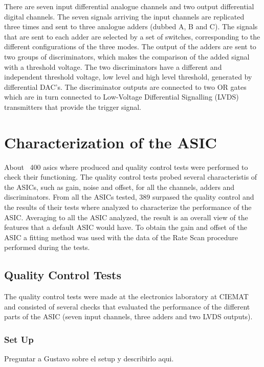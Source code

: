 \documentclass[a4paper,10pt]{book}
\begin{document}
There are seven input differential analogue channels and two output differential digital channels.
The seven signals arriving the input channels are replicated three times and sent to three analogue adders (dubbed A, B and C). The signals
that are sent to each adder are selected by a set of switches, corresponding to the different configurations of the three modes.
The output of the adders are sent to two groups of discriminators, which makes the comparison of the added signal with a threshold voltage.
The two discriminators have a different and independent threshold voltage, low level and high level threshold, generated by differential DAC's. 
The discriminator outputs are connected to two OR gates which are in turn connected to Low-Voltage Differential Signalling (LVDS) transmitters 
that provide the trigger signal. 


\section{Characterization of the ASIC}

About ~400 asics where produced and quality control tests were performed to check their functioning. The quality control tests probed 
several characteristis of the ASICs, such as gain, noise and offset, for all the channels, adders and discriminators. From all the ASICs
tested, 389 surpased the quality control and the results of their tests where analyzed to characterize the performance of the ASIC. 
Averaging to all the ASIC analyzed, the result is an overall view of the features that a default ASIC would have. To obtain the gain
and offset of the ASIC a fitting method was used with the data of the Rate Scan procedure performed during the tests. 

\subsection{Quality Control Tests}
\label{subsec:qatest}
The quality control tests were made at the electronics laboratory at CIEMAT and consisted of several checks that evaluated
the performance of the different parts of the ASIC (seven input channels, three adders and two LVDS outputs).

\subsubsection{Set Up}

Preguntar a Gustavo sobre el setup y describirlo aqui. 
\end{document}
